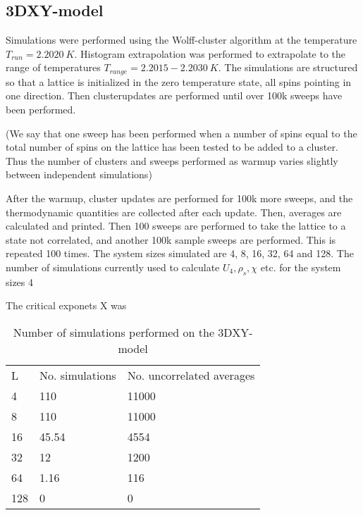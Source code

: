 \documentclass[a4paper]{article}
\begin{document}
\subsection{3DXY-model}
Simulations were performed using the Wolff-cluster algorithm at the temperature $T_{run} = 2.2020~K$. Histogram extrapolation was performed to extrapolate to the range of temperatures $T_{range} = 2.2015-2.2030 ~ K$.
The simulations are structured so that a lattice is initialized in the zero temperature state, all spins pointing in one direction. Then clusterupdates are performed until over 100k sweeps have been performed.

(We say that one sweep has been performed when a number of spins equal to the total number of spins on the lattice has been tested to be added to a cluster.
Thus the number of clusters and sweeps performed as warmup varies slightly between independent simulations)

After the warmup, cluster updates are performed for 100k more sweeps, and the thermodynamic quantities are collected after each update. Then, averages are calculated and printed. Then 100 sweeps are performed to take the lattice to a state not correlated, and another 100k sample sweeps are performed. This is repeated 100 times. The system sizes simulated are 4, 8, 16, 32, 64 and 128. 
The number of simulations currently used to calculate $U_4, \rho_s, \chi $ etc. for the system sizes 4

The critical exponets X was

\begin{table}[htpb]
\begin{center}
\begin{tabular}{l l l}
  L & No. simulations & No. uncorrelated averages\\
  4 & 110 & 11000\\
  8 & 110 & 11000\\
  16 & 45.54 & 4554\\
  32 & 12 & 1200\\
  64 & 1.16 & 116 \\
  128 & 0  & 0 \\
\end{tabular}
\end{center}
\caption{Number of simulations performed on the 3DXY-model}
\end{table}
\end{document}
